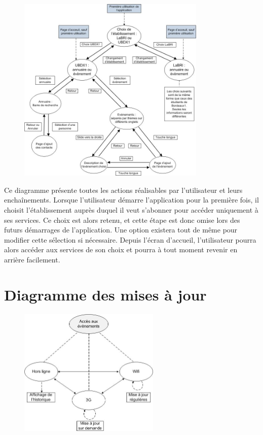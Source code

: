 \documentclass [pdftex,12pt] {report}
\begin{document}
\begin{figure}[h]
  \center
  \includegraphics[width=0.8\textwidth]{resources/useCases.jpg}
\end{figure}

\newpage
Ce diagramme présente toutes les actions réalisables par l'utilisateur et leurs enchaînements.
Lorsque l'utilisateur démarre l'application pour la première fois, il choisit l'établissement auprès duquel il veut s'abonner pour accéder uniquement à ses services. Ce choix est alors retenu, et cette étape est donc omise lors des futurs démarrages de l'application. Une option existera tout de même pour modifier cette sélection si nécessaire. Depuis l'écran d'accueil, l'utilisateur pourra alors accéder aux services de son choix et pourra à tout moment revenir en arrière facilement.

\section{Diagramme des mises à jour}

\begin{figure}[h]
  \center
  \includegraphics[width=0.6\textwidth]{resources/state_diagram.jpg}
\end{figure}
\end{document}
